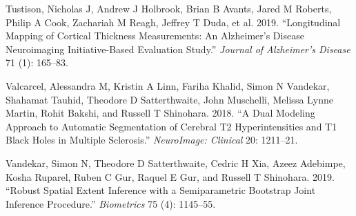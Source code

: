 \documentclass[]{elsarticle} %
\newlength{\cslhangindent}
\newenvironment{cslreferences}%
  {\setlength{\parindent}{0pt}%
  \everypar{\setlength{\hangindent}{\cslhangindent}}\ignorespaces}%
  {\par}
\begin{document}
\begin{cslreferences}
\leavevmode\hypertarget{ref-tustison2019longitudinal}{}%
Tustison, Nicholas J, Andrew J Holbrook, Brian B Avants, Jared M Roberts, Philip A Cook, Zachariah M Reagh, Jeffrey T Duda, et al. 2019. ``Longitudinal Mapping of Cortical Thickness Measurements: An Alzheimer's Disease Neuroimaging Initiative-Based Evaluation Study.'' \emph{Journal of Alzheimer's Disease} 71 (1): 165--83.

\leavevmode\hypertarget{ref-valcarcel2018dual}{}%
Valcarcel, Alessandra M, Kristin A Linn, Fariha Khalid, Simon N Vandekar, Shahamat Tauhid, Theodore D Satterthwaite, John Muschelli, Melissa Lynne Martin, Rohit Bakshi, and Russell T Shinohara. 2018. ``A Dual Modeling Approach to Automatic Segmentation of Cerebral T2 Hyperintensities and T1 Black Holes in Multiple Sclerosis.'' \emph{NeuroImage: Clinical} 20: 1211--21.

\leavevmode\hypertarget{ref-vandekar2019robust}{}%
Vandekar, Simon N, Theodore D Satterthwaite, Cedric H Xia, Azeez Adebimpe, Kosha Ruparel, Ruben C Gur, Raquel E Gur, and Russell T Shinohara. 2019. ``Robust Spatial Extent Inference with a Semiparametric Bootstrap Joint Inference Procedure.'' \emph{Biometrics} 75 (4): 1145--55.
\end{cslreferences}
\end{document}
